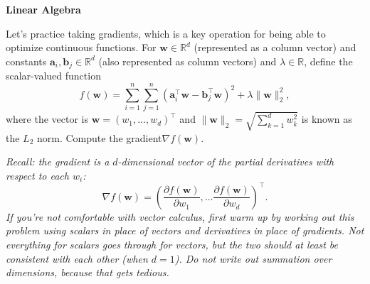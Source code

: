\item {} {\bf Linear Algebra}

Let's practice taking gradients, which is a key operation for being able to
optimize continuous functions. For $\mathbf w \in \mathbb R^d$ (represented as a
column vector) and constants $\mathbf a_i, \mathbf b_j \in \mathbb R^d$ (also
represented as column vectors) and $\lambda \in \mathbb R$, define the
scalar-valued function
$$f(\mathbf w) = \sum_{i=1}^n \sum_{j=1}^n (\mathbf a_i^\top \mathbf w - \mathbf b_j^\top \mathbf w)^2 + \lambda \|\mathbf w\|_2^2,$$
where the vector is $\mathbf w = (w_1, \dots, w_d)^\top$ and
$\|\mathbf w\|_2 = \sqrt{\sum_{k=1}^d w_k^2}$ is known as the $L_2$ norm.
Compute the gradient$\nabla f(\mathbf w)$.

{\em Recall: the gradient is a $d$-dimensional vector of the partial derivatives
with respect to each $w_i$:
$$\nabla f(\mathbf w) = \left(\frac{\partial f(\mathbf w)}{\partial w_1}, \dots \frac{\partial f(\mathbf w)}{\partial w_d}\right)^\top.$$
If you're not comfortable with vector calculus, first warm up by working out
this problem using scalars in place of vectors and derivatives in place of
gradients. Not everything for scalars goes through for vectors, but the two
should at least be consistent with each other (when $d=1$). Do not write out
summation over dimensions, because that gets tedious.}
